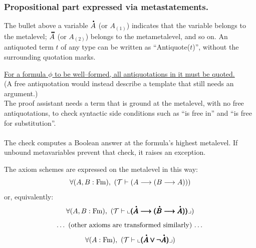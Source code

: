 \subsubsection{Propositional part expressed via metastatements.}
\begin{notation}%
The bullet above a variable $\meta{A}$ (or $A_{(1)}$) indicates that the variable belongs to the metalevel; $\mmeta{A}$ (or $A_{(2)}$) belongs to the metametalevel, and so on. An antiquoted term $t$ of any type can be written as ``Antiquote($t$)'', without the surrounding quotation marks.
\end{notation}
\begin{note}
\underline{For a formula $\phi$ to be well--formed, all antiquotations in it must be quoted.}\\

(A free antiquotation would instead describe a template that still needs an argument.)\\
The proof assistant needs a term that is ground at the metalevel, with no free antiquotations, to check syntactic side conditions such as ``is free in'' and ``is free for substitution''.\\ %
\\
The check computes a Boolean answer at the formula's highest metalevel. If unbound metavariables prevent that check, it raises an exception.
\end{note}


The axiom schemes are expressed on the metalevel in this way:
\[
\forall (A,B : \Fm),\ %
(\Tau \vdash (A \implies (B \implies A)))
\]
or, equivalently:
\[
\forall (A,B : \Fm),\ %
(\Tau \vdash 
\llcorner
\pmb{(}\meta{\pmb{A}} \pmb{\implies} \pmb{(}\meta{\pmb{B}} \pmb{\implies} \meta{\pmb{A}}\pmb{)}\pmb{)}
\lrcorner
)%
\]
\[
\text{\dots\ (other axioms are transformed similarly)\ \dots}
\]
\[
\forall (A : \Fm),\ %
(\Tau \vdash 
\llcorner
\pmb{(}\meta{\pmb{A}} \pmb{\lor} \pmb{\neg} \meta{\pmb{A}}\pmb{)}
\lrcorner
)
\]


